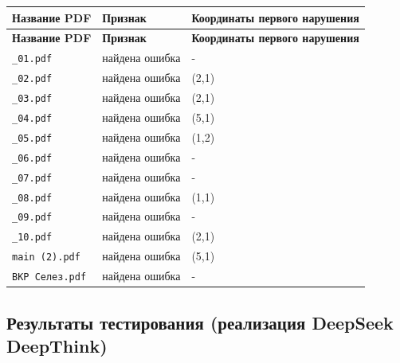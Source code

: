 \begin{longtable}{|p{}|p{}|p{}|}
\hline
\textbf{Название PDF} & \textbf{Признак} & \textbf{Координаты первого нарушения} \\
\hline
\endfirsthead
\hline
\textbf{Название PDF} & \textbf{Признак} & \textbf{Координаты первого нарушения} \\
\hline
\endhead

\texttt{\_01.pdf} & найдена ошибка & - \\ \hline
\texttt{\_02.pdf} & найдена ошибка & (2,1) \\ \hline
\texttt{\_03.pdf} & найдена ошибка & (2,1) \\ \hline
\texttt{\_04.pdf} & найдена ошибка & (5,1) \\ \hline
\texttt{\_05.pdf} & найдена ошибка & (1,2) \\ \hline
\texttt{\_06.pdf} & найдена ошибка & - \\ \hline
\texttt{\_07.pdf} & найдена ошибка & - \\ \hline
\texttt{\_08.pdf} & найдена ошибка & (1,1) \\ \hline
\texttt{\_09.pdf} & найдена ошибка & - \\ \hline
\texttt{\_10.pdf} & найдена ошибка & (2,1) \\ \hline
\texttt{main (2).pdf} & найдена ошибка & (5,1) \\ \hline
\texttt{ВКР Селез.pdf} & найдена ошибка & - \\ \hline

\end{longtable}

\subsection{Результаты тестирования (реализация DeepSeek DeepThink)}

